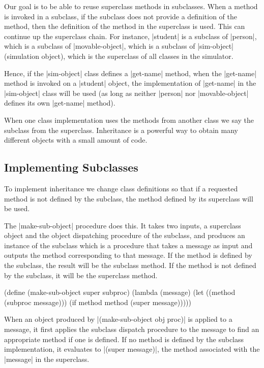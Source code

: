 \begin{schemeregion}
Our goal is to be able to reuse superclass methods in subclasses.  When a method is invoked in a subclass, if the subclass does not provide a definition of the method, then the definition of the method in the superclass is used.  This can continue up the superclass chain.  For instance, \scheme|student| is a subclass of \scheme|person|, which is a subclass of \scheme|movable-object|, which is a subclass of \scheme|sim-object| (simulation object), which is the superclass of all classes in the simulator.  

Hence, if the \scheme|sim-object| class defines a \scheme|get-name| method, when the \scheme|get-name| method is invoked on a \scheme|student| object, the implementation of \scheme|get-name| in the \scheme|sim-object| class will be used (as long as neither \scheme|person| nor \scheme|movable-object| defines its own \scheme|get-name| method).  

When one class implementation uses the methods from another class we say the subclass  from the superclass.  Inheritance is a powerful way to obtain many different objects with a small amount of code.  

\subsection{Implementing Subclasses} 

To implement inheritance we change class definitions so that if a requested method is not defined by the subclass, the method defined by its superclass will be used. 

The \scheme|make-sub-object| procedure does this.  It takes two inputs, a superclass object and the object dispatching procedure of the subclass, and produces an instance of the subclass which is a procedure that takes a message as input and outputs the method corresponding to that message.  If the method is defined by the subclass, the result will be the subclass method.  If the method is not defined by the subclass, it will be the superclass method.

\begin{schemedisplay}
(define (make-sub-object super subproc)
  (lambda (message)
    (let ((method (subproc message)))
      (if method method (super message)))))
\end{schemedisplay}

When an object produced by \scheme|(make-sub-object obj proc)| is applied to a message, it first applies the subclass dispatch procedure to the message to find an appropriate method if one is defined.  If no method is defined by the subclass implementation, it evaluates to \scheme|(super message)|, the method associated with the \scheme|message| in the superclass.


\end{schemeregion}
